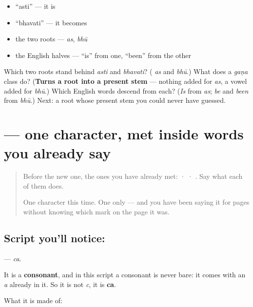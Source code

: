 \begin{itemize}
\raggedright
  \item \textquotedblleft{}asti\textquotedblright{} — it is
  \item \textquotedblleft{}bhavati\textquotedblright{} — it becomes
  \item the two roots — \emph{as}, \emph{bhū}
  \item the English halves — \textquotedblleft{}is\textquotedblright{} from one, \textquotedblleft{}been\textquotedblright{} from the other
\end{itemize}

\begin{tcolorbox}[breakable,colback=teal!4,colframe=teal!35!black,title={Before you move on}]
Which two roots stand behind \emph{asti} and \emph{bhavati}? (\textbf{} \emph{as} and \emph{bhū}.) What does a \emph{gaṇa} class do? (\textbf{Turns a root into a present stem} — nothing added for \emph{as}, a vowel added for \emph{bhū}.) Which English words descend from each? (\emph{Is} from \emph{as}; \emph{be} and \emph{been} from \emph{bhū}.) Next: a root whose present stem you could never have guessed.
\end{tcolorbox}
\section[\texorpdfstring{\sk{च} (ca)}{च (ca)}]{ — one character, met inside words you already say}

\label{lesson:SA-S207-letter-ca}



\begin{quote}
Before the new one, the ones you have already met:  ·  · . Say what each of them does.

One character this time. One only — and you have been saying it for pages without knowing which mark on the page it was.
\end{quote}

\subsection*{Script you'll notice: }
\textbf{} — \emph{ca}.

It is a \textbf{consonant}, and in this script a consonant is never bare: it comes with an \emph{a} already in it. So it is not \emph{c}, it is \textbf{ca}.

What it is made of:

